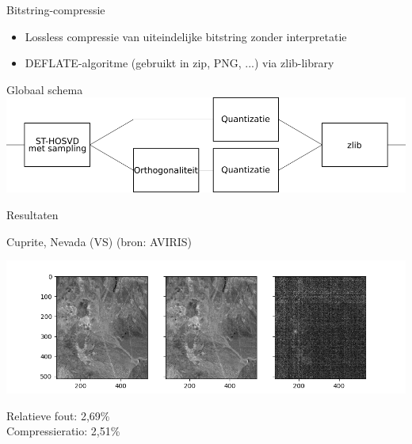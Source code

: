\documentclass[t,12pt,dutch
\ifx\beamermode\undefined\else,\beamermode\fi
]{beamer}
\begin{document}
\begin{frame}{Bitstring-compressie}

\begin{itemize}
\item Lossless compressie van uiteindelijke bitstring zonder interpretatie
\item DEFLATE-algoritme (gebruikt in zip, PNG, ...) via zlib-library
\end{itemize}

\end{frame}

\begin{frame}{Globaal schema}
\vfill
\includegraphics[scale=0.19]{images/globaal_schema.png}
\end{frame}

\begin{frame}{}
\begin{center}
\vspace*{\fill}
\vspace*{\fill}
\Huge
Resultaten
\normalsize
\vspace*{\fill}
\end{center}
\end{frame}

\begin{frame}{Cuprite, Nevada (VS) (bron: AVIRIS)}

\begin{center}
\includegraphics[scale=0.5]{images/cuprite_0-025.png}
\end{center}

Relatieve fout: 2,69\%\\
Compressieratio: 2,51\%

\end{frame}
\end{document}
